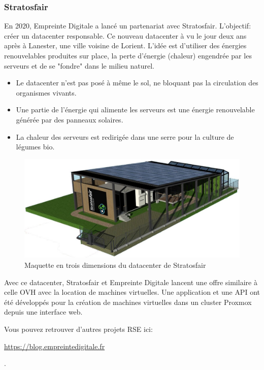\documentclass[12pt]{article}
\begin{document}
\subsubsection{Stratosfair}
En 2020, Empreinte Digitale a lancé un partenariat avec Stratosfair. 
L'objectif: créer un datacenter responsable. 
Ce nouveau datacenter à vu le jour deux ans après à Lanester, une ville voisine de Lorient. 
L'idée est d'utiliser des énergies renouvelables produites sur place, la perte d'énergie (chaleur) engendrée par les serveurs et de se "fondre" dans le milieu naturel.
\begin{itemize}
    \item Le datacenter n'est pas posé à même le sol, ne bloquant pas la circulation des organismes vivants.
    \item Une partie de l'énergie qui alimente les serveurs est une énergie renouvelable générée par des panneaux solaires.
    \item La chaleur des serveurs est redirigée dans une serre pour la culture de légumes bio.
\end{itemize}

\begin{figure}[!ht]
    \centering
    \includegraphics[width=\textwidth]{src/scheme_strato.jpg}
    \caption{Maquette en trois dimensions du datacenter de Stratosfair}
    \label{fig:strato}
\end{figure}

Avec ce datacenter, Stratosfair et Empreinte Digitale lancent une offre similaire à celle OVH avec la location de machines virtuelles.
Une application et une \gls{API} ont été développés pour la création de machines virtuelles dans un \gls{cluster} \gls{Proxmox} depuis une interface web.

Vous pouvez retrouver d'autres projets \gls{RSE} ici: \begin{hilite} \url{https://blog.empreintedigitale.fr} \end{hilite}.
\end{document}
